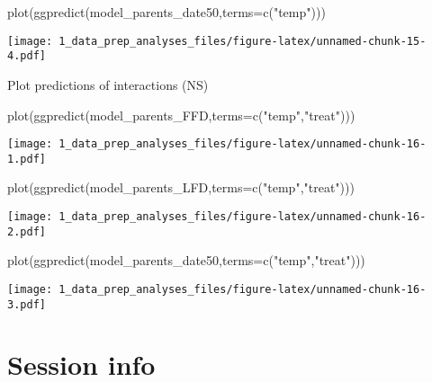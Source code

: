\documentclass[
]{article}
\newenvironment{Shaded}{\begin{snugshade}}{\end{snugshade}}
\newcommand{\AttributeTok}[1]{\textcolor[rgb]{0.77,0.63,0.00}{#1}}
\newcommand{\FunctionTok}[1]{\textcolor[rgb]{0.00,0.00,0.00}{#1}}
\newcommand{\NormalTok}[1]{#1}
\newcommand{\StringTok}[1]{\textcolor[rgb]{0.31,0.60,0.02}{#1}}
\begin{document}
\begin{Shaded}
\begin{Highlighting}[]
\FunctionTok{plot}\NormalTok{(}\FunctionTok{ggpredict}\NormalTok{(model\_parents\_date50,}\AttributeTok{terms=}\FunctionTok{c}\NormalTok{(}\StringTok{"temp"}\NormalTok{)))}
\end{Highlighting}
\end{Shaded}

\texttt{[image: 1\_data\_prep\_analyses\_files/figure-latex/unnamed-chunk-15-4.pdf]}

Plot predictions of interactions (NS)

\begin{Shaded}
\begin{Highlighting}[]
\FunctionTok{plot}\NormalTok{(}\FunctionTok{ggpredict}\NormalTok{(model\_parents\_FFD,}\AttributeTok{terms=}\FunctionTok{c}\NormalTok{(}\StringTok{"temp"}\NormalTok{,}\StringTok{"treat"}\NormalTok{)))}
\end{Highlighting}
\end{Shaded}

\texttt{[image: 1\_data\_prep\_analyses\_files/figure-latex/unnamed-chunk-16-1.pdf]}

\begin{Shaded}
\begin{Highlighting}[]
\FunctionTok{plot}\NormalTok{(}\FunctionTok{ggpredict}\NormalTok{(model\_parents\_LFD,}\AttributeTok{terms=}\FunctionTok{c}\NormalTok{(}\StringTok{"temp"}\NormalTok{,}\StringTok{"treat"}\NormalTok{)))}
\end{Highlighting}
\end{Shaded}

\texttt{[image: 1\_data\_prep\_analyses\_files/figure-latex/unnamed-chunk-16-2.pdf]}

\begin{Shaded}
\begin{Highlighting}[]
\FunctionTok{plot}\NormalTok{(}\FunctionTok{ggpredict}\NormalTok{(model\_parents\_date50,}\AttributeTok{terms=}\FunctionTok{c}\NormalTok{(}\StringTok{"temp"}\NormalTok{,}\StringTok{"treat"}\NormalTok{)))}
\end{Highlighting}
\end{Shaded}

\texttt{[image: 1\_data\_prep\_analyses\_files/figure-latex/unnamed-chunk-16-3.pdf]}

\hypertarget{session-info}{%
\section{Session info}\label{session-info}}
\end{document}
